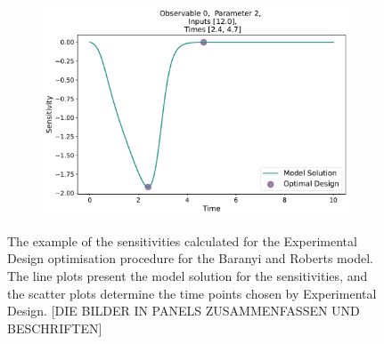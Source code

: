 \documentclass[10pt,A4paper]{article}
\begin{document}
\begin{figure}[H]
      \begin{subfigure}{.9\textwidth}
          \centering
          \includegraphics[scale=0.35]{Figures/Sensitivity_Results_baranyi_roberts_ode_fisher_determinant_rel_sensit_cont_2times_2temps_001_x_00_p_02.pdf}
      \end{subfigure}
    \caption{{\footnotesize The example of the sensitivities calculated for the Experimental Design optimisation procedure for the Baranyi and Roberts model.
    The line plots present the model solution for the sensitivities, and the scatter plots determine the time points chosen by Experimental Design. [DIE BILDER IN PANELS ZUSAMMENFASSEN UND BESCHRIFTEN]}} 
    \label{fig:baranyi_roberts_sensitivities}
    \end{figure}
\end{document}
